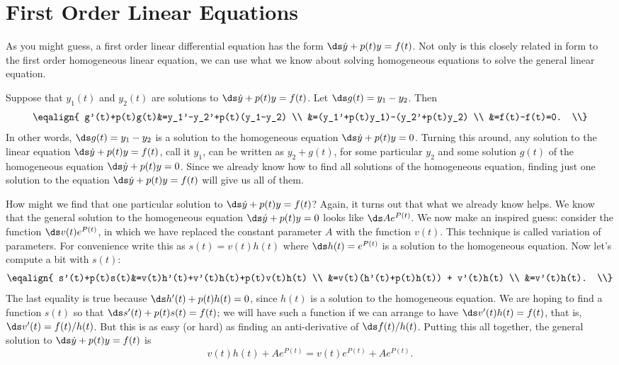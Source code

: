 \section{First Order Linear Equations}{}{}
\nobreak
As you might guess, a first order linear differential equation has the form 
$\ds \dot y + p(t)y = f(t)$. Not only is this closely related in form
to the first order homogeneous linear equation, we can use what we
know about solving homogeneous equations to solve the general linear
equation. 

Suppose that $y_1(t)$ and $y_2(t)$ are solutions to 
$\ds \dot y + p(t)y = f(t)$. Let $\ds g(t)=y_1-y_2$. Then
$$\eqalign{
 g'(t)+p(t)g(t)&=y_1'-y_2'+p(t)(y_1-y_2) \\
&=(y_1'+p(t)y_1)-(y_2'+p(t)y_2) \\
&=f(t)-f(t)=0. \\}
$$
In other words, $\ds g(t)=y_1-y_2$ is a solution to the homogeneous
equation $\ds \dot y + p(t)y = 0$. Turning this around, any solution
to the linear equation $\ds \dot y + p(t)y = f(t)$, call it $y_1$, can
be written as $y_2+g(t)$, for some particular $y_2$ and some solution
$g(t)$ of the homogeneous equation $\ds \dot y + p(t)y = 0$. Since we
already know how to find all solutions of the homogeneous equation,
finding just one solution to the equation $\ds \dot y + p(t)y = f(t)$
will give us all of them.

How might we find that one particular solution to $\ds \dot y + p(t)y
= f(t)$? Again, it turns out that what we already know helps. We know
that the general solution to the homogeneous equation
$\ds \dot y + p(t)y = 0$ looks like $\ds Ae^{P(t)}$. We now make an
inspired guess: consider the function $\ds v(t)e^{P(t)}$, in which we
have replaced the constant parameter $A$ with the function
$v(t)$. This technique is called 
{\dfont variation of parameters}.
For
convenience write this as $s(t)=v(t)h(t)$ where $\ds h(t)=e^{P(t)}$ 
is a solution to the
homogeneous equation. Now let's compute a bit with $s(t)$:
$$\eqalign{
s'(t)+p(t)s(t)&=v(t)h'(t)+v'(t)h(t)+p(t)v(t)h(t) \\
&=v(t)(h'(t)+p(t)h(t)) + v'(t)h(t) \\
&=v'(t)h(t). \\}
$$
The last equality is true because $\ds h'(t)+p(t)h(t)=0$, since $h(t)$
is a solution to the homogeneous equation. We are hoping to find a
function $s(t)$ so that $\ds s'(t)+p(t)s(t)=f(t)$; we will have such a
function if we can arrange to have $\ds v'(t)h(t)=f(t)$, that is,
$\ds v'(t)=f(t)/h(t)$. But this is as easy (or hard) as finding an
anti-derivative of $\ds f(t)/h(t)$. Putting this all together, the
general solution to $\ds \dot y + p(t)y = f(t)$ is
$$v(t)h(t)+Ae^{P(t)} = v(t)e^{P(t)}+Ae^{P(t)}.$$

